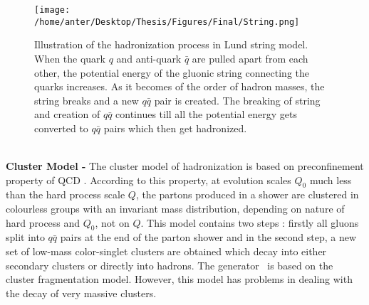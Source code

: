\begin{figure}[!h]
\begin{center}
\hspace*{-4mm}
\texttt{[image: /home/anter/Desktop/Thesis/Figures/Final/String.png]}\\
\vspace*{4mm}
\caption[Illustration of the hadronization process in Lund string model.]{Illustration of the hadronization process in Lund string model\footnotemark. When the quark $q$ and anti-quark $\bar{q}$ are pulled apart from each other, the potential energy of the gluonic string connecting the quarks increases. As it becomes of the order of hadron masses, the string breaks and a new $q\bar{q}$ pair is created. The breaking of string and creation of $q\bar{q}$ continues till all the potential energy gets converted to $q\bar{q}$ pairs which then get hadronized.}
\label{fig:string}
\end{center}
\end{figure} \\
{\bf Cluster Model -} The cluster model of hadronization \cite{Marchesini:1987cf,Webber:1983if} is based on preconfinement property of QCD \cite{Amati:1979fg}. According to this property, at evolution scales $Q_0$ much less than the hard process scale $Q$, the partons produced in a shower are clustered in colourless groups with an invariant mass distribution, depending on nature of hard process and $Q_0$, not on $Q$. This model contains two steps : firstly all gluons split into $q\bar{q}$ pairs at the end of the parton shower and in the second step, a new set of low-mass color-singlet clusters are obtained which decay into either secondary clusters or directly into hadrons. The generator \HERWIG~is based on the cluster fragmentation model. However, this model has problems in dealing with the decay of very massive clusters. 


